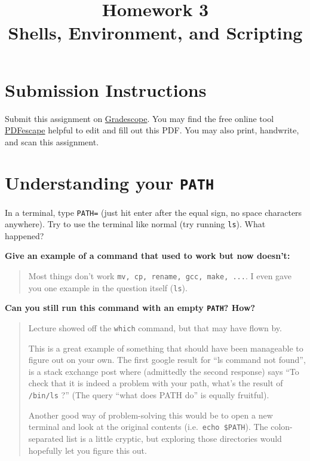 \documentclass{article}
\begin{document}
\fancyhead[L]{}
\fancyhead[R]{}

\fancyfoot[C]{\color{gray} \thepage~/~\pageref*{LastPage}}
\pagestyle{fancyplain}

\title{\textbf{Homework 3\\Shells, Environment, and Scripting}}
\author{\textbf{\color{red}{Due: Wednesday, October 4th, 11:59PM (Hard Deadline)}}}
\date{}
\maketitle


\section*{Submission Instructions}
Submit this assignment on \href{https://gradescope.com/courses/9999}{Gradescope}.
You may find the free online tool \href{https://www.pdfescape.com}{PDFescape}
helpful to edit and fill out this PDF.
You may also print, handwrite, and scan this assignment.


\section{Understanding your \texttt{PATH}}

In a terminal, type \texttt{PATH=} (just hit enter after the equal sign, no
space characters anywhere). Try to use the terminal like normal (try running
\texttt{ls}). What happened?

\textbf{Give an example of a command that used to work but now doesn't:}
\begin{quote}
  \color{violet}
  Most things don't work \texttt{mv, cp, rename, gcc, make, ...}. I even gave
  you one example in the question itself (\texttt{ls}).
\end{quote}

\textbf{Can you still run this command with an empty \texttt{PATH}? How?}
\begin{quote}
  \color{violet}
  Lecture showed off the \texttt{which} command, but that may have flown by.

  This is a great example of something that should have been manageable to
  figure out on your own.
  The first google result for ``ls command not found'', is a stack exchange
  post where (admittedly the second response) says ``To check that it is
  indeed a problem with your path, what's the result of \texttt{/bin/ls} ?''
  (The query ``what does PATH do'' is equally fruitful).

  Another good way of problem-solving this would be to open a new terminal and
  look at the original contents (i.e.\ \texttt{echo \$PATH}). The
  colon-separated list is a little cryptic, but exploring those directories
  would hopefully let you figure this out.
\end{quote}
\end{document}
